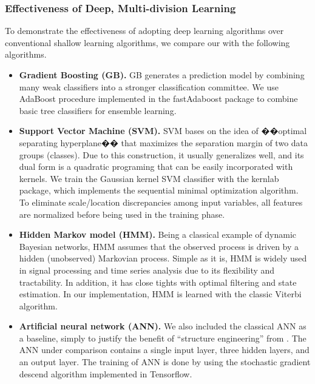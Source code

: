 \subsubsection{Effectiveness of Deep, Multi-division Learning}
To demonstrate the effectiveness of adopting deep learning algorithms over conventional shallow learning algorithms, we compare our \modelname with the following algorithms.
\begin{itemize}
  \item
  \textbf{Gradient Boosting (GB).}
  GB \cite{bib:friedman2002stochastic} generates a prediction model by combining many weak classifiers into a stronger classification committee.
  We use AdaBoost procedure implemented in the fastAdaboost package to combine basic tree classifiers for ensemble learning.
  \item
  \textbf{Support Vector Machine (SVM).}
  SVM \cite{bib:wang2005support} bases on the idea of ��optimal separating hyperplane�� that maximizes the separation margin of two data groups (classes).
  Due to this construction, it usually generalizes well, and its dual form is a quadratic programing that can be easily incorporated with kernels.
  We train the Gaussian kernel SVM classifier with the kernlab package, which implements the sequential minimal optimization algorithm.
  To eliminate scale/location discrepancies among input variables, all features are normalized before being used in the training phase.
  \item
  \textbf{Hidden Markov model (HMM).} \cite{bib:rabiner1986introduction}
  Being a classical example of dynamic Bayesian networks, HMM assumes that the observed process is driven by a hidden (unobserved) Markovian process. Simple as it is, HMM is widely used in signal processing and time series analysis due to its flexibility and tractability. In addition, it has close tights with optimal filtering and state estimation. In our implementation, HMM is learned with the classic Viterbi algorithm. 
  \item
  \textbf{Artificial neural network (ANN).}\cite{bib:wang2003artificial}
  We also included the classical ANN as a baseline, simply to justify the benefit of ``structure engineering'' from \modelname. The ANN under comparison contains a single input layer, three hidden layers, and an output layer. The training of ANN is done by using the stochastic gradient descend algorithm implemented in Tensorflow.  

\end{itemize}
